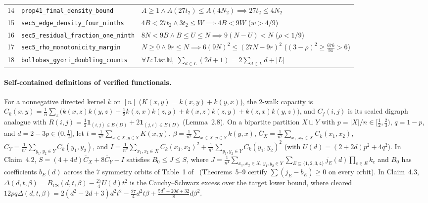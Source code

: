 \documentclass[10pt,twocolumn]{article}
\begin{document}
\begin{table}[t]
\begin{tabular}{@{}cll@{}}
14 & \texttt{prop41\_final\_density\_bound} & $A\ge 1 \wedge A(27t_2)\le A(4N_2) \implies 27t_2 \le 4N_2$ \\
15 & \texttt{sec5\_edge\_density\_four\_ninths} & $4B < 27t_2 \wedge 3t_2 \le W \implies 4B < 9W$ ($w > 4/9$) \\
16 & \texttt{sec5\_residual\_fraction\_one\_ninth} & $8N < 9B \wedge B\le U\le N \implies 9(N-U) < N$ ($\rho < 1/9$) \\
17 & \texttt{sec5\_rho\_monotonicity\_margin} & $N\ge 0 \wedge 9r\le N \implies 6(9N)^2 \le (27N-9r)^2$ ($(3-\rho)^2 \ge \tfrac{676}{81} > 6$) \\
18 & \texttt{bollobas\_gyori\_doubling\_counts} & $\forall L:\mathrm{List}\,\mathbb{N},\ \sum_{d\in L}(2d+1) = 2\sum_{d\in L} d + |L|$ \\
\bottomrule
\end{tabular}
\end{table}

\paragraph{Self-contained definitions of verified functionals.}
For a nonnegative directed kernel $k$ on $[n]$ ($K(x,y) = k(x,y) + k(y,x)$), the 2-walk capacity is $C_k(x,y) = \tfrac{1}{n}\sum_z \bigl(k(x,z)k(y,z) + \tfrac{1}{2}k(z,x)k(z,y) + k(x,z)k(z,y) + k(z,x)k(y,z)\bigr)$, and $C_f(i,j)$ is its scaled digraph analogue with $R(i,j) = \tfrac{1}{2}\mathbf{1}_{(i,j)\in E(D)} + 2\mathbf{1}_{(j,i)\in E(D)}$ (Lemma~2.8). On a bipartite partition $X \sqcup Y$ with $p = |X|/n \in [\tfrac{1}{2}, \tfrac{2}{3})$, $q = 1-p$, and $d = 2 - 3p \in (0,\tfrac{1}{2}]$, let $t = \tfrac{1}{n^2}\sum_{x\in X,y\in Y} K(x,y)$, $\beta = \tfrac{1}{n^2}\sum_{x\in X,y\in Y} k(y,x)$, $\bar{C}_X = \tfrac{1}{n^2}\sum_{x_1,x_2\in X} C_k(x_1,x_2)$, $\bar{C}_Y = \tfrac{1}{n^2}\sum_{y_1,y_2\in Y} C_k(y_1,y_2)$, and $I = \tfrac{1}{n^2}\sum_{x_1,x_2\in X} C_k(x_1,x_2)^2 + \tfrac{1}{n^2}\sum_{y_1,y_2\in Y} C_k(y_1,y_2)^2$ (with $U(d) = (2+2d)p^2 + 4q^2$). In Claim~4.2, $S = (4+4d)\bar{C}_X + 8\bar{C}_Y - I$ satisfies $B_0 \le J \le S$, where $J = \tfrac{1}{n^4}\sum_{x_1,x_2\in X,\, y_1,y_2\in Y}\sum_{E\subseteq\{1,2,3,4\}} j_E(d) \prod_{e\in E} k_e$ and $B_0$ has coefficients $b_E(d)$ across the 7 symmetry orbits of Table~1 of~\cite{CuiGyoriZhangZhu2026} (Theorems~5--9 certify $\sum (j_E - b_E) \ge 0$ on every orbit). In Claim~4.3, $\Delta(d,t,\beta) = B_{\mathrm{CS}}(d,t,\beta) - \tfrac{27}{4}U(d)t^2$ is the Cauchy--Schwarz excess over the target lower bound, where cleared $12pq\Delta(d,t,\beta) = 2(d^2-2d+3)d^2 t^2 - \tfrac{27}{4}d^2 t\beta + \tfrac{5d^2-20d+32}{8}d\beta^2$.
\end{document}
